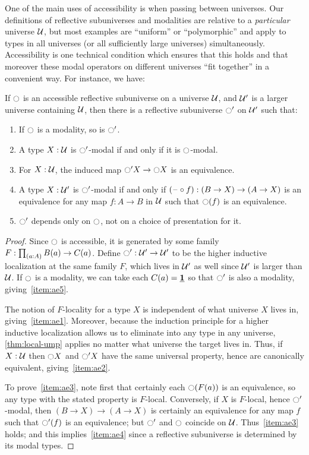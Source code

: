 One of the main uses of accessibility is when passing between universes.
Our definitions of reflective subuniverses and modalities are relative to a \emph{particular} universe $\mathcal{U}$, but most examples are ``uniform'' or ``polymorphic'' and apply to types in all universes (or all sufficiently large universes) simultaneously.
Accessibility is one technical condition which ensures that this holds and that moreover these modal operators on different universes ``fit together'' in a convenient way.
For instance, we have:

\begin{lem}\label{thm:acc-extend}
  If ${\ocircle}$ is an accessible reflective subuniverse on a universe $\mathcal{U}$, and $\mathcal{U}'$ is a larger universe containing $\mathcal{U}$, then there is a reflective subuniverse ${\ocircle}'$ on $\mathcal{U}'$ such that:
  \begin{enumerate}
  \item If ${\ocircle}$ is a modality, so is ${\ocircle}'$.\label{item:ae5}
  \item A type $X:\mathcal{U}$ is ${\ocircle}'$-modal if and only if it is ${\ocircle}$-modal.\label{item:ae1}
  \item For $X:\mathcal{U}$, the induced map ${\ocircle}' X \to {\ensuremath{\ocircle}} X$ is an equivalence.\label{item:ae2}
  \item A type $X:\mathcal{U}'$ is ${\ocircle}'$-modal if and only if $(\mathord{\hspace{1pt}\text{--}\hspace{1pt}}\circ f) : (B\to X) \to (A\to X)$ is an equivalence for any map $f:A\to B$ in $\mathcal{U}$ such that ${\ocircle}(f)$ is an equivalence.\label{item:ae3}
  \item ${\ocircle}'$ depends only on ${\ocircle}$, not on a choice of presentation for it.\label{item:ae4}
  \end{enumerate}
\end{lem}
\begin{proof}
  Since ${\ocircle}$ is accessible, it is generated by some family $F:\prd{a:A} B(a) \to C(a)$.
  Define ${\ocircle}':\mathcal{U}'\to\mathcal{U}'$ to be the higher inductive localization at the same family $F$, which lives in $\mathcal{U}'$ as well since $\mathcal{U}'$ is larger than $\mathcal{U}$.
  If ${\ocircle}$ is a modality, we can take each $C(a)=\underline{\mathbf{1}}$ so that ${\ocircle}'$ is also a modality, giving~\ref{item:ae5}.

  The notion of $F$-locality for a type $X$ is independent of what universe $X$ lives in, giving~\ref{item:ae1}.
  Moreover, because the induction principle for a higher inductive localization allows us to eliminate into any type in any universe, \cref{thm:local-ump} applies no matter what universe the target lives in.
  Thus, if $X:\mathcal{U}$ then ${\ocircle} X$ and ${\ocircle}' X$ have the same universal property, hence are canonically equivalent, giving~\ref{item:ae2}.

  To prove~\ref{item:ae3}, note first that certainly each ${\ocircle} (F(a))$ is an equivalence, so any type with the stated property is $F$-local.
  Conversely, if $X$ is $F$-local, hence ${\ocircle}'$-modal, then $(B\to X) \to (A\to X)$ is certainly an equivalence for any map $f$ such that ${\ocircle}'(f)$ is an equivalence; but ${\ocircle}'$ and ${\ocircle}$ coincide on $\mathcal{U}$.
  Thus~\ref{item:ae3} holds; and this implies~\ref{item:ae4} since a reflective subuniverse is determined by its modal types.
\end{proof}

